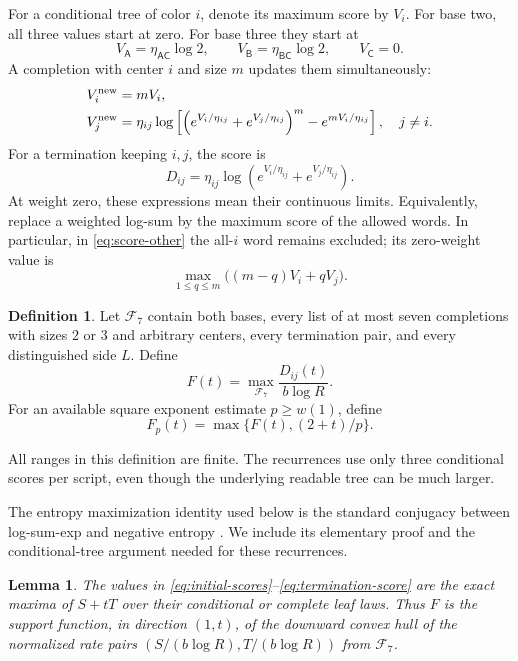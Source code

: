 \documentclass[11pt]{article}
\numberwithin{equation}{section}
\newtheorem{lemma}[theorem]{Lemma}
\theoremstyle{definition}
\newtheorem{definition}[theorem]{Definition}
\theoremstyle{remark}
\newcommand{\colA}{\mathsf A}
\newcommand{\colB}{\mathsf B}
\newcommand{\colC}{\mathsf C}
\newcommand{\calF}{\mathcal F}
\begin{document}
For a conditional tree of color \(i\), denote its maximum score by
\(V_i\).
For base two, all three values start at zero.
For base three they start at
\begin{equation}\label{eq:initial-scores}
 V_{\colA}=\eta_{\colA\colC}\log2,\qquad
 V_{\colB}=\eta_{\colB\colC}\log2,\qquad
 V_{\colC}=0.
\end{equation}
A completion with center \(i\) and size \(m\) updates them simultaneously:
\begin{align}
 V_i^{\rm new}&=mV_i, \label{eq:score-center}\\
 V_j^{\rm new}
 &=\eta_{ij}\log\left[
   \left(e^{V_i/\eta_{ij}}+e^{V_j/\eta_{ij}}\right)^m
       -e^{mV_i/\eta_{ij}}\right],\quad j\ne i. \label{eq:score-other}
\end{align}
For a termination keeping \(i,j\), the score is
\begin{equation}\label{eq:termination-score}
 D_{ij}=\eta_{ij}\log
       \left(e^{V_i/\eta_{ij}}+e^{V_j/\eta_{ij}}\right).
\end{equation}
At weight zero, these expressions mean their continuous limits.
Equivalently, replace a weighted log-sum by the maximum score of the
allowed words.
In particular, in \eqref{eq:score-other} the all-\(i\) word remains
excluded; its zero-weight value is
\[
 \max_{1\le q\le m}\bigl((m-q)V_i+qV_j\bigr).
\]

\begin{definition}\label{def:support-function}
Let \(\calF_7\) contain both bases, every list of at most seven
completions with sizes \(2\) or \(3\) and arbitrary centers, every
termination pair, and every distinguished side \(L\).
Define
\begin{equation}\label{eq:F-definition}
 F(t)=\max_{\calF_7}\frac{D_{ij}(t)}{b\log R}.
\end{equation}
For an available square exponent estimate \(p\ge w(1)\), define
\[
 F_p(t)=\max\{F(t),(2+t)/p\}.
\]
\end{definition}

All ranges in this definition are finite.
The recurrences use only three conditional scores per script, even
though the underlying readable tree can be much larger.

The entropy maximization identity used below is the standard conjugacy
between log-sum-exp and negative entropy
\cite[Example~3.25]{boyd-vandenberghe}.  We include its elementary
proof and the conditional-tree argument needed for these recurrences.

\begin{lemma}\label{lem:score-optimality}
The values in \eqref{eq:initial-scores}--\eqref{eq:termination-score}
are the exact maxima of \(S+tT\) over their conditional or complete
leaf laws.  Thus \(F\) is the support function, in direction \((1,t)\),
of the downward convex hull of the normalized rate pairs
\((S/(b\log R),T/(b\log R))\) from \(\calF_7\).
\end{lemma}
\end{document}
